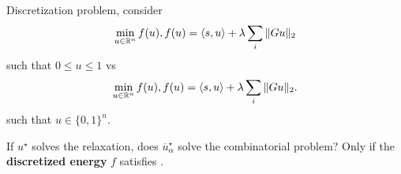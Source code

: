 \begin{remark}
  Discretization problem, consider
  \begin{align}
    \label{eq:124}
    \min_{u \in \R^{n}} f(u), f(u) = \IP{s, u} + \lambda \sum_{i} \| G
    u \|_{2} 
  \end{align} such that $0 \leq u \leq 1$ vs
  \begin{align}
    \label{eq:125}
    \min_{u \in \R^{n}} f(u), f(u) = \IP{s, u} + \lambda \sum_{i} \| G
    u \|_{2}.
  \end{align} such that $u \in \{ 0, 1 \}^{n}$.

  If $u^{\star}$ solves the relaxation, does $\overline
  u^{\star}_{\alpha}$ solve the combinatorial problem?  Only if the
  \textbf{discretized energy} $f$ satisfies \gcc.
\end{remark}

